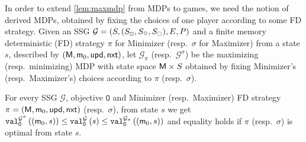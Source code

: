 \documentclass[a4paper,UKenglish,cleveref,autoref,thm-restate]{lipics-v2021}
\newcommand{\+}[1]{\mathbb{#1}}
\newcommand{\?}[1]{\mathcal{#1}}
\newcommand{\x}{\times}
\newcommand{\rsymbol}{\ocircle}
\newcommand{\zsymbol}{\Box}
\newcommand{\osymbol}{\Diamond}
\newcommand{\zstates}{\states_\zsymbol}
\newcommand{\rstates}{\states_\rsymbol}
\newcommand{\ostates}{\states_\osymbol}
\newcommand{\obj}{\mathtt{O}}
\newcommand{\lrc}[1]{\left(#1\right)}
\newcommand{\tuple}[1]{\lrc{#1}}
\newcommand{\game}{{\mathcal G}}
\newcommand{\gametuple}{\tuple{\states,(\zstates,\ostates,\rstates),\transition,\probp}}
\newcommand{\states}{S}
\newcommand{\s}{s}
\newcommand{\transition}{{E}}
\newcommand{\probp}{P}
\newcommand{\zstrat}{\sigma}
\newcommand{\ostrat}{\pi}
\newcommand{\memory}{{\sf M}}
\newcommand{\updatefun}{upd}
\newcommand{\memconf}{{\sf m}}
\newcommand{\memconfset}{{\sf M}}
\newcommand{\memsuc}{{\sf nxt}}
\newcommand{\memup}{{\sf \updatefun}}
\newcommand{\memstrattuple}{\tuple{\memory,\initmem,\memup,\memsuc}}
\newcommand{\initmem}{\memconf_0}
\begin{document}
In order to extend \cref{lem:maxmdp} from MDPs to games,
we need the notion of derived MDPs, obtained by fixing the choices of one
player according to some FD strategy.
Given an SSG $\game=\gametuple$ and a finite memory deterministic (FD)
strategy $\ostrat$ for Minimizer (resp.\ $\zstrat$ for Maximizer) from a state
$\s$, described by $\memstrattuple$,
let $\game_{\ostrat}$ (resp.\ $\game^{\zstrat}$) be the maximizing
(resp.\ minimizing) MDP with state space $\memconfset \x \states$
obtained by fixing Minimizer's (resp.\ Maximizer's) choices according to
$\ostrat$ (resp.\ $\zstrat$).

\begin{lemma}\label{lem:MDP_to_game}
  For every SSG $\game$, objective $\obj$ and
  Minimizer (resp.\ Maximizer) FD strategy $\ostrat = \memstrattuple$ (resp.\ $\zstrat$),
  from state $\s$ we get
  $
    \valueof[\game^{\zstrat}][\obj]{\tuple{\initmem,\s}} \le
    \valueof[\game][\obj]{\s} \le \valueof[\game_{\ostrat}][\obj]{\tuple{\initmem,\s}}   
  $
  and equality holds if $\ostrat$ (resp.\ $\zstrat$) is optimal from state $\s$. 
\end{lemma}
\end{document}
